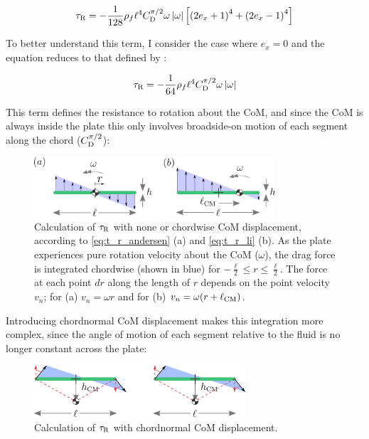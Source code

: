\documentclass[draft]{jfm} %
\begin{document}
\begin{equation}
\tau_\textnormal{R} = -\frac{1}{128}\rho_f\ell^4 C_{\textup{D}}^{\pi /2} \omega  \left| \omega \right| \left [ \left ( 2e_x+1 \right )^4 + \left ( 2e_x-1 \right )^4\right ] \label{eq:t_r_li}
\end{equation}

To better understand this term, I consider the case where $e_x=0$ and the equation reduces to that defined by \cite{andersen2005analysis}:

\begin{equation}
\tau_\textnormal{R} = -\frac{1}{64}\rho_f\ell^4 C_{\textup{D}}^{\pi /2} \omega  \left| \omega \right| \label{eq:t_r_andersen}
\end{equation}

This term defines the resistance to rotation about the CoM, and since the CoM is always inside the plate this only involves broadside-on motion of each segment along the chord ($C_{\textup{D}}^{\pi /2}$):

\begin{figure}
    \centering
    \includegraphics[width=0.8\textwidth]{pics/T_R_diagram1_2.png}
    \caption{Calculation of $\tau_\textnormal{R}$ with none or chordwise CoM displacement, according to \ref{eq:t_r_andersen} (a) and \ref{eq:t_r_li} (b). As the plate experiences pure rotation velocity about the CoM ($\omega$), the drag force is integrated chordwise (shown in blue) for $-\frac{\ell}{2} \le r \le \frac{\ell}{2}$. The force at each point $dr$ along the length of $r$ depends on the point velocity $v_n$; for (a) $v_n = \omega r$ and for (b) $v_n = \omega(r + \ell_{\textup{CM}})$.}
    \label{fig:t_r_diagram_1}
\end{figure}

Introducing chordnormal CoM displacement makes this integration more complex, since the angle of motion of each segment relative to the fluid is no longer constant across the plate:

\begin{figure}
    \centering
    \includegraphics[width=0.7\textwidth]{pics/g12.png}
    \caption{Calculation of $\tau_\textnormal{R}$ with chordnormal CoM displacement.}
    \label{fig:t_r_diagram_2}
\end{figure}
\end{document}
